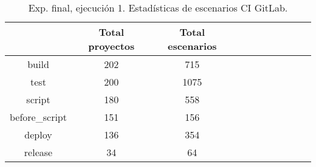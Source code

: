 \begin{table}
  \centering
  \caption{Exp. final, ejecución 1. Estadísticas de escenarios CI GitLab.}
  \label{tab:tabla_f1_9}

\begin{footnotesize}
\renewcommand{\arraystretch}{1.5} %
\begin{tabular}{ccccccccccc}
  \hline
  {} &  Total proyectos &  Total escenarios \\
  \hline
  build                      &                 202 &           715 \\
  test                       &                 200 &          1075 \\
  script                     &                 180 &           558 \\
  before\_script              &                 151 &           156 \\
  deploy                     &                 136 &           354 \\
  release                    &                  34 &            64 \\

\end{tabular}
\end{footnotesize}
\end{table}
